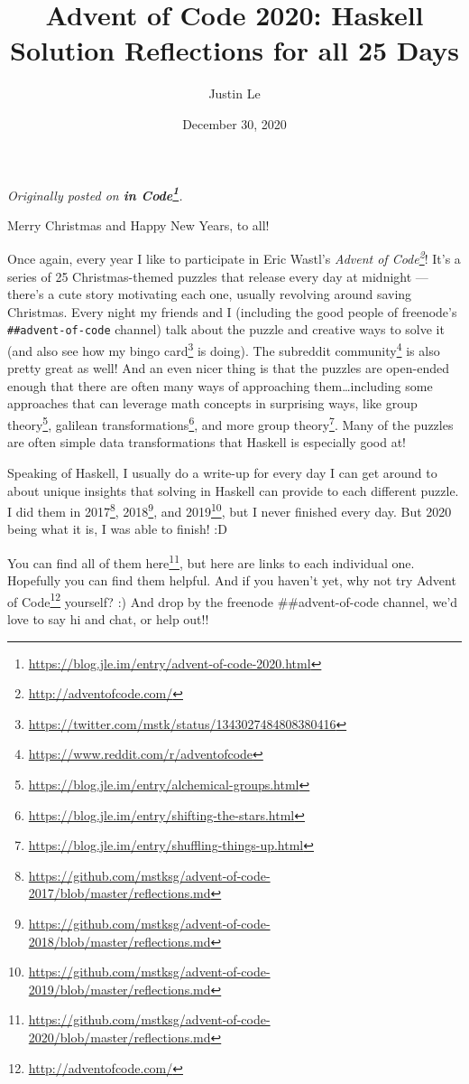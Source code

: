 \documentclass[]{article}
\title{Advent of Code 2020: Haskell Solution Reflections for all 25 Days}
\author{Justin Le}
\date{December 30, 2020}
\renewcommand{\href}[2]{#2\footnote{\url{#1}}}
\begin{document}
\maketitle

\emph{Originally posted on
\textbf{\href{https://blog.jle.im/entry/advent-of-code-2020.html}{in Code}}.}

Merry Christmas and Happy New Years, to all!

Once again, every year I like to participate in Eric Wastl's
\emph{\href{http://adventofcode.com/}{Advent of Code}}! It's a series of 25
Christmas-themed puzzles that release every day at midnight --- there's a cute
story motivating each one, usually revolving around saving Christmas. Every
night my friends and I (including the good people of freenode's
\texttt{\#\#advent-of-code} channel) talk about the puzzle and creative ways to
solve it (and also see how my
\href{https://twitter.com/mstk/status/1343027484808380416}{bingo card} is
doing). The \href{https://www.reddit.com/r/adventofcode}{subreddit community} is
also pretty great as well! And an even nicer thing is that the puzzles are
open-ended enough that there are often many ways of approaching
them\ldots including some approaches that can leverage math concepts in
surprising ways, like
\href{https://blog.jle.im/entry/alchemical-groups.html}{group theory},
\href{https://blog.jle.im/entry/shifting-the-stars.html}{galilean
transformations}, and
\href{https://blog.jle.im/entry/shuffling-things-up.html}{more group theory}.
Many of the puzzles are often simple data transformations that Haskell is
especially good at!

Speaking of Haskell, I usually do a write-up for every day I can get around to
about unique insights that solving in Haskell can provide to each different
puzzle. I did them in
\href{https://github.com/mstksg/advent-of-code-2017/blob/master/reflections.md}{2017},
\href{https://github.com/mstksg/advent-of-code-2018/blob/master/reflections.md}{2018},
and
\href{https://github.com/mstksg/advent-of-code-2019/blob/master/reflections.md}{2019},
but I never finished every day. But 2020 being what it is, I was able to finish!
:D

You can find
\href{https://github.com/mstksg/advent-of-code-2020/blob/master/reflections.md}{all
of them here}, but here are links to each individual one. Hopefully you can find
them helpful. And if you haven't yet, why not try
\href{http://adventofcode.com/}{Advent of Code} yourself? :) And drop by the
freenode \#\#advent-of-code channel, we'd love to say hi and chat, or help out!!
\end{document}
